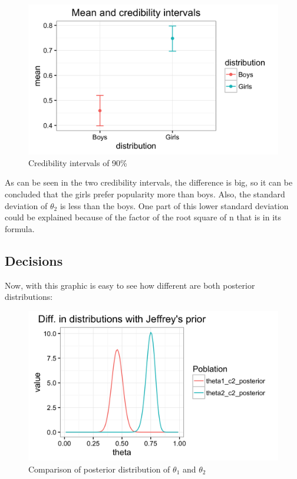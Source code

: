 \documentclass{article}
\begin{document}
\begin{figure}[ht!]
    \centering
    \includegraphics[scale=.20]{11_Assignment1/CI_intervals.png}
    \caption{Credibility intervals of 90\%}
    \label{fig:fig8}
\end{figure}

As can be seen in the two credibility intervals, the difference is big, so it can be concluded that the girls prefer popularity more than boys. Also, the standard deviation of $\theta_2$ is less than the boys. One part of this lower standard deviation could be explained because of the factor of the root square of n that is in its formula.

\subsection{Decisions}

Now, with this graphic is easy to see how different are both posterior distributions:

\begin{figure}[ht!]
    \centering
    \includegraphics[scale=.20]{11_Assignment1/diff.png}
    \caption{Comparison of posterior distribution of $\theta_1$ and $\theta_2$}
    \label{fig:fig7}
\end{figure}
\end{document}
